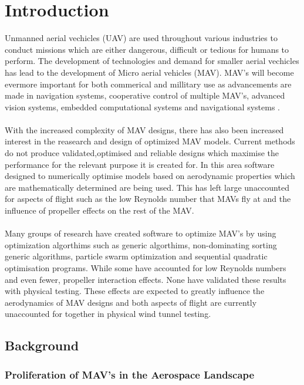 \graphicspath{{./Figs/}}

\chapter{Introduction} 


Unmanned aerial vechicles (UAV) are used throughout various industries to conduct missions which are either dangerous, difficult or tedious for humans to perform. The development of technologies and demand for smaller aerial vechicles has lead to the development of Micro aerial vehicles (MAV). MAV's will become evermore important for both commerical and millitary use as advancements are made in navigation systems, cooperative control of multiple MAV's, advanced vision systems, embedded computational systems and navigational systems .\\
\\
With the increased complexity of MAV designs, there has also been increased interest in the reasearch and design of optimized MAV models. Current methods  do not produce validated,optimised and reliable designs which maximise the performance for the relevant purpose it is created for. In this area software designed to numerically optimise models based on aerodynamic properties which are mathematically determined are being used. This has left large unaccounted for aspects of flight such as the low Reynolds number that MAVs fly at and the influence of propeller effects on the rest of the MAV.\\
\\
Many groups of research have  created software to optimize MAV's by using optimization algorthims such as generic algorthims, non-dominating sorting generic algorithms, particle swarm optimization and sequential quadratic optimisation programs. While some have accounted for low Reynolds numbers and even fewer, propeller interaction effects. None have validated these results with physical testing. These effects are expected to greatly influence the aerodynamics of MAV designs and both aspects of flight are currently unaccounted for together in physical wind tunnel testing.

\section{Background}

\subsection{Proliferation of MAV's in the Aerospace Landscape}
\label{subsec:ProliferationMAVs}

